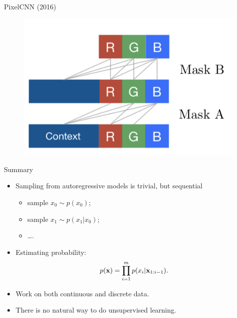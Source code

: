 \begin{frame}{PixelCNN (2016)}
\begin{minipage}[t]{0.5\columnwidth}
\begin{figure}[h]
	\end{figure}
	\vspace{-0.4cm}
	\begin{figure}
		\centering
        \includegraphics[width=0.65\linewidth]{figs/pixelcnn2.png}
	\end{figure}
\end{minipage}
\end{frame}
\begin{frame}{Summary}
    \begin{itemize}
        \item Sampling from autoregressive models is trivial, but sequential
        \begin{itemize}
            \item sample $x_0 \sim p(x_0)$;
            \item sample $x_1 \sim p(x_1 | x_0)$;
            \item \dots.
        \end{itemize}
        \item Estimating probability:
        \[
            p(\mathbf{x}) = \prod_{i=1}^m p(x_i | \mathbf{x}_{1:i - 1}).
        \]
        \item Work on both continuous and discrete data.
        \item There is no natural way to do unsupervised learning.
    \end{itemize}
\end{frame}

 